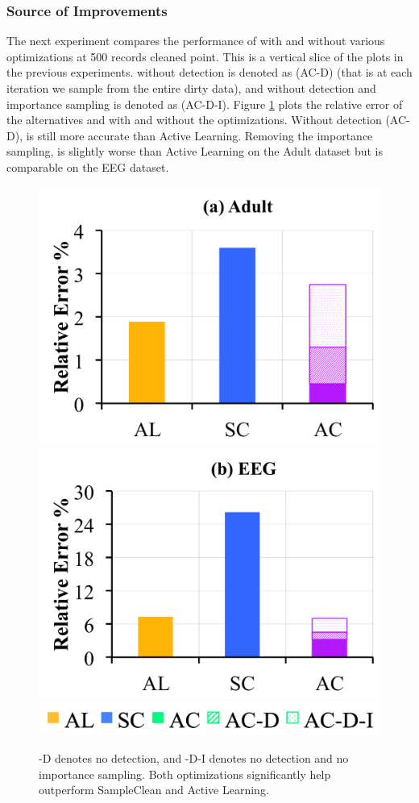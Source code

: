\subsubsection{Source of Improvements}
The next experiment compares the performance of \sys with and without various optimizations at 500 records cleaned point. 
This is a vertical slice of the plots in the previous experiments.
\sys without detection is denoted as (AC-D) (that is at each iteration we sample from the entire dirty data), and \sys without detection and importance sampling is denoted as (AC-D-I).
Figure \ref{opts} plots the relative error of the alternatives and \sys with and without the optimizations.
Without detection (AC-D), \sys is still more accurate than Active Learning.
Removing the importance sampling, \sys is slightly worse than Active Learning on the Adult dataset but is comparable on the EEG dataset.

\begin{figure}[t]\vspace{0.5em}
\centering
 \includegraphics[width=0.49\columnwidth]{exp/exp8a.png}
 \includegraphics[width=0.49\columnwidth]{exp/exp8b.png}
 \includegraphics[width=0.5\columnwidth]{exp/legend-8.png}\vspace{-1em}
 \caption{ -D denotes no detection, and -D-I denotes no detection and no importance sampling. Both optimizations significantly help \sys outperform SampleClean and Active Learning. \label{opts}}\vspace{-1.5em}
\end{figure}

